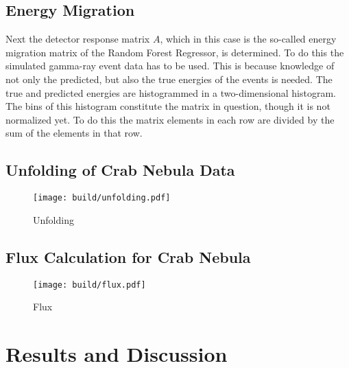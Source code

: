         
        \subsection{Energy Migration}
            Next the detector response matrix $A$, which in this case is the so-called energy migration matrix of the Random Forest Regressor, is determined.
            To do this the simulated gamma-ray event data has to be used.
            This is because knowledge of not only the predicted, but also the true energies of the events is needed.
            The true and predicted energies are histogrammed in a two-dimensional histogram.
            The bins of this histogram constitute the matrix in question, though it is not normalized yet.
            To do this the matrix elements in each row are divided by the sum of the elements in that row.
        \subsection{Unfolding of Crab Nebula Data}
            \begin{figure}
                \centering
                \texttt{[image: build/unfolding.pdf]}
                \caption{
                    Unfolding
                }
                \label{fig:unfolding}
            \end{figure}

        \subsection{Flux Calculation for Crab Nebula}
            \begin{figure}
                \centering
                \texttt{[image: build/flux.pdf]}
                \caption{
                    Flux
                }
                \label{fig:flux}
            \end{figure}


%
%
    \section{Results and Discussion}

\newpage
\printbibliography
\newpage


